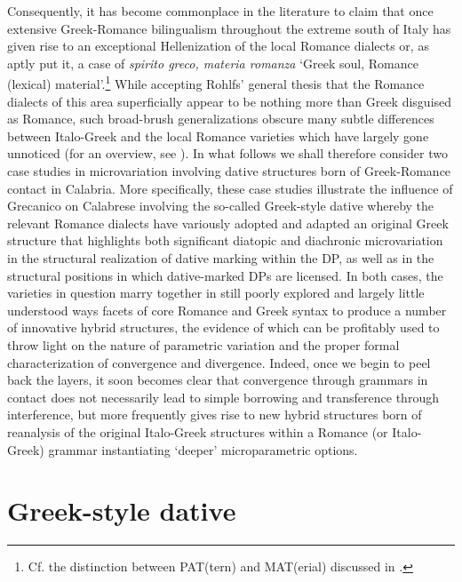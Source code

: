 \documentclass[output=paper,modfonts,nonflat]{langsci/langscibook}
\begin{document}
Consequently, it has become commonplace in the literature to claim that once extensive Greek-Romance bilingualism throughout the extreme south of Italy has given rise to an exceptional Hellenization of the local Romance dialects or, as \citet[61]{Rohlfs1933} aptly put it, a case of \textit{spirito greco, materia romanza} `Greek soul, Romance (lexical) material'.\footnote{Cf. the distinction between PAT(tern) and MAT(erial) discussed in \citet{Matras2004,Matras2007}.} While accepting Rohlfs’ general thesis that the Romance dialects of this area superficially appear to be nothing more than Greek disguised as Romance, such broad-brush generalizations obscure many subtle differences between Italo-Greek and the local Romance varieties which have largely gone unnoticed (for an overview, see \citealt{Ledgeway2013}). In what follows we shall therefore consider two case studies in microvariation involving dative structures born of Greek-Romance contact in Calabria. More specifically, these case studies illustrate the influence of Grecanico on Calabrese involving the so-called Greek-style dative whereby the relevant Romance dialects have variously adopted and adapted an original Greek structure that highlights both significant diatopic and diachronic microvariation in the structural realization of dative marking within the DP, as well as in the structural positions in which dative-marked DPs are licensed. In both cases, the varieties in question marry together in still poorly explored and largely little understood ways facets of core Romance and Greek syntax to produce a number of innovative hybrid structures, the evidence of which can be profitably used to throw light on the nature of parametric variation and the proper formal characterization of convergence and divergence. Indeed, once we begin to peel back the layers, it soon becomes clear that convergence through grammars in contact does not necessarily lead to simple borrowing and transference through interference, but more frequently gives rise to new hybrid structures born of reanalysis of the original Italo-Greek structures within a Romance (or Italo-Greek) grammar instantiating `deeper' microparametric options.

\section{Greek-style dative}
\end{document}

